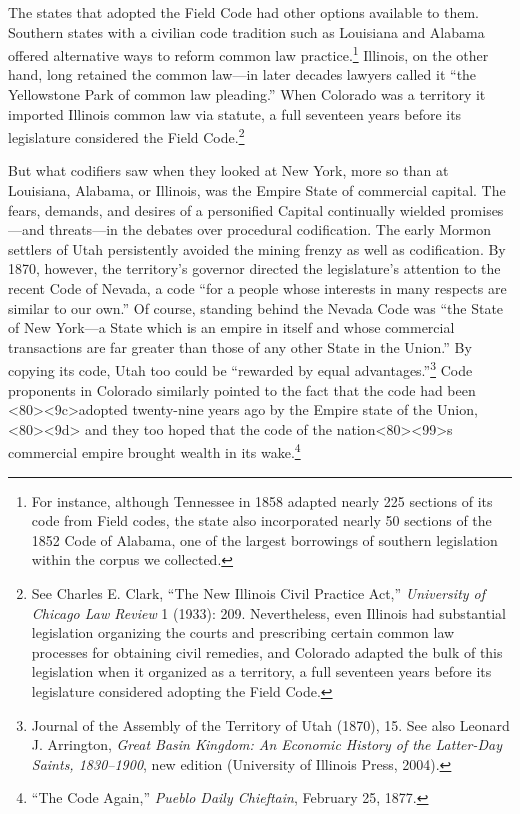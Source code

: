 \documentclass[12pt,]{article}
\let\rmarkdownfootnote\footnote%
\def\footnote{\protect\rmarkdownfootnote}
\begin{document}
The states that adopted the Field Code had other options available to
them. Southern states with a civilian code tradition such as Louisiana
and Alabama offered alternative ways to reform common law
practice.\footnote{For instance, although Tennessee in 1858 adapted
  nearly 225 sections of its code from Field codes, the state also
  incorporated nearly 50 sections of the 1852 Code of Alabama, one of
  the largest borrowings of southern legislation within the corpus we
  collected.} Illinois, on the other hand, long retained the common
law---in later decades lawyers called it ``the Yellowstone Park of
common law pleading.'' When Colorado was a territory it imported
Illinois common law via statute, a full seventeen years before its
legislature considered the Field Code.\footnote{See Charles E. Clark,
  ``The New Illinois Civil Practice Act,'' \emph{University of Chicago
  Law Review} 1 (1933): 209. Nevertheless, even Illinois had substantial
  legislation organizing the courts and prescribing certain common law
  processes for obtaining civil remedies, and Colorado adapted the bulk
  of this legislation when it organized as a territory, a full seventeen
  years before its legislature considered adopting the Field Code.}

But what codifiers saw when they looked at New York, more so than at
Louisiana, Alabama, or Illinois, was the Empire State of commercial
capital. The fears, demands, and desires of a personified Capital
continually wielded promises---and threats---in the debates over
procedural codification. The early Mormon settlers of Utah persistently
avoided the mining frenzy as well as codification. By 1870, however, the
territory's governor directed the legislature's attention to the recent
Code of Nevada, a code ``for a people whose interests in many respects
are similar to our own.'' Of course, standing behind the Nevada Code was
``the State of New York---a State which is an empire in itself and whose
commercial transactions are far greater than those of any other State in
the Union.'' By copying its code, Utah too could be ``rewarded by equal
advantages.''\footnote{Journal of the Assembly of the Territory of Utah
  (1870), 15. See also Leonard J. Arrington, \emph{Great Basin Kingdom:
  An Economic History of the Latter-Day Saints, 1830--1900}, new edition
  (University of Illinois Press, 2004).} Code proponents in Colorado
similarly pointed to the fact that the code had been
\textless80\textgreater\textless9c\textgreater adopted twenty-nine years
ago by the Empire state of the
Union,\textless80\textgreater\textless9d\textgreater{} and they too
hoped that the code of the
nation\textless80\textgreater\textless99\textgreater s commercial empire
brought wealth in its wake.\footnote{``The Code Again,'' \emph{Pueblo
  Daily Chieftain}, February 25, 1877.}
\end{document}
